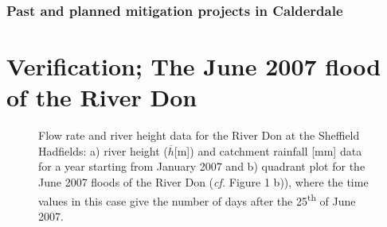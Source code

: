 \documentclass[11pt,a4paper]{article}
\begin{document}
\subsubsection{Past and planned mitigation projects in Calderdale}

\newpage
\section{Verification; The June 2007 flood of the River Don}
\begin{figure}[H]
\centering
{}
\hfill
{}
\caption{Flow rate and river height data for the River Don at the Sheffield Hadfields: a) river height ($\overline{h}$[m]) \cite{Calder-Don} and catchment rainfall [mm] data \cite{NRFA} for a year starting from January 2007 and b) quadrant plot for the June 2007 floods of the River Don (\textit{cf.} Figure 1 b)), where the time values in this case give the number of days after the 25\textsuperscript{th} of June 2007.}
\end{figure}
\end{document}
